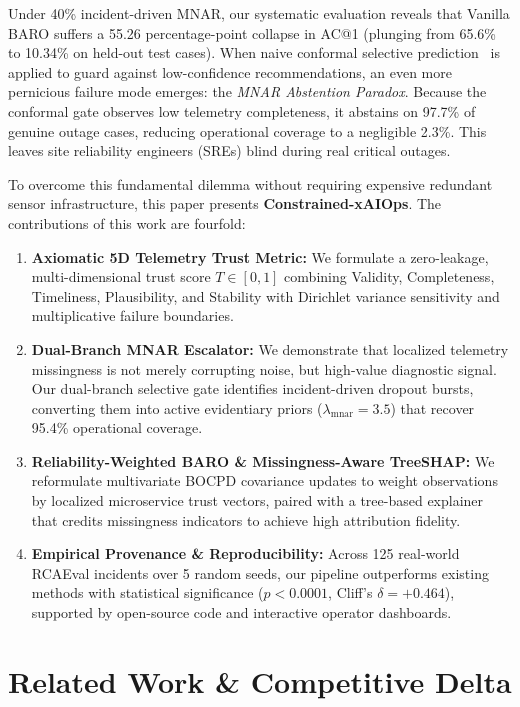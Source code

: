 \documentclass[conference]{IEEEtran}
\begin{document}
Under 40\% incident-driven MNAR, our systematic evaluation reveals that Vanilla BARO suffers a 55.26 percentage-point collapse in AC@1 (plunging from 65.6\% to 10.34\% on held-out test cases). When naive conformal selective prediction~\cite{geifman2017selective,angelopoulos2021gentle} is applied to guard against low-confidence recommendations, an even more pernicious failure mode emerges: the \emph{MNAR Abstention Paradox}. Because the conformal gate observes low telemetry completeness, it abstains on 97.7\% of genuine outage cases, reducing operational coverage to a negligible 2.3\%. This leaves site reliability engineers (SREs) blind during real critical outages.

To overcome this fundamental dilemma without requiring expensive redundant sensor infrastructure, this paper presents \textbf{Constrained-xAIOps}. The contributions of this work are fourfold:
\begin{enumerate}
    \item \textbf{Axiomatic 5D Telemetry Trust Metric:} We formulate a zero-leakage, multi-dimensional trust score $T \in [0, 1]$ combining Validity, Completeness, Timeliness, Plausibility, and Stability with Dirichlet variance sensitivity and multiplicative failure boundaries.
    \item \textbf{Dual-Branch MNAR Escalator:} We demonstrate that localized telemetry missingness is not merely corrupting noise, but high-value diagnostic signal. Our dual-branch selective gate identifies incident-driven dropout bursts, converting them into active evidentiary priors ($\lambda_{\text{mnar}} = 3.5$) that recover 95.4\% operational coverage.
    \item \textbf{Reliability-Weighted BARO \& Missingness-Aware TreeSHAP:} We reformulate multivariate BOCPD covariance updates to weight observations by localized microservice trust vectors, paired with a tree-based explainer that credits missingness indicators to achieve high attribution fidelity.
    \item \textbf{Empirical Provenance \& Reproducibility:} Across 125 real-world RCAEval incidents over 5 random seeds, our pipeline outperforms existing methods with statistical significance ($p < 0.0001$, Cliff's $\delta = +0.464$), supported by open-source code and interactive operator dashboards.
\end{enumerate}

\section{Related Work \& Competitive Delta}
\end{document}
